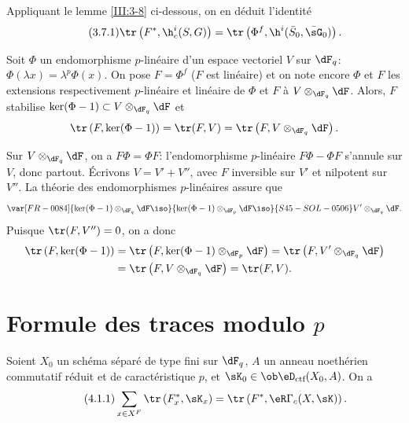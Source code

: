 Appliquant le lemme \ref{III:3-8} ci-dessous, on en déduit l'identité 
\begin{equation*}\tag{3.7.1}\label{III:eq:3-7-1}
  \tr\left(F^*,\h_c^i(S,G)\right) = \tr\left(\Phi^f,\h^i(\bar S_0,\bar\sG_0)\right) \text{.}
\end{equation*}





\begin{lemma_}\label{III:3-8}
Soit $\Phi$ un endomorphisme $p$-linéaire d'un espace vectoriel $V$ sur 
$\dF_q$: $\Phi(\lambda x) = \lambda^p\Phi(x)$. On pose $F=\Phi^f$ ($F$ est 
linéaire) et on note encore $\Phi$ et $F$ les extensions respectivement 
$p$-linéaire et linéaire de $\Phi$ et $F$ à $V\otimes_{\dF_q}\dF$. Alors, $F$ stabilise 
$\ker(\Phi-1)\subset V\otimes_{\dF_q}\dF$ et 
\[
  \tr\left(F,\ker(\Phi-1)\right) = \tr(F,V) = \tr\left(F,V\otimes_{\dF_q}\dF\right) \text{.}
\]
\end{lemma_}

Sur $V\otimes_{\dF_q}\dF$, on a $F\Phi = \Phi F$: l'endomorphisme $p$-linéaire 
$F\Phi-\Phi F$ s'annule sur $V$, donc partout. Écrivons $V=V'+V''$, avec $F$ 
inversible sur $V'$ et nilpotent sur $V''$. La théorie des endomorphismes 
$p$-linéaires assure que 
\[
  \var[FR-0084]{\ker(\Phi-1)\otimes_{\dF_q}\dF \iso}{\ker(\Phi-1)\otimes_{\dF_p}\dF \iso}{S45-SOL-0506} V'\otimes_{\dF_q}\dF \text{.}
\]
Puisque $\tr(F,V'') = 0$, on a donc 
\begin{align*}
  \tr\left(F,\ker(\Phi-1)\right) 
    &= \tr\left(F,\ker(\Phi-1)\otimes_{\dF_p}\dF\right) = \tr\left(F,V'\otimes_{\dF_q}\dF\right) \\
    &= \tr\left(F,V\otimes_{\dF_q}\dF\right) = \tr(F,V) \text{.}
\end{align*}










\section{Formule des traces modulo \texorpdfstring{$p$}{p}}\label{III:4}





\begin{theorem_}\label{III:4-1}
Soient $X_0$ un schéma séparé de type fini sur $\dF_q$, $A$ un anneau 
noethérien commutatif réduit et de caractéristique $p$, et 
$\sK_0\in\ob\eD_\textnormal{ctf}(X_0,A)$. On a 
\begin{equation*}\tag{4.1.1}\label{III:eq:4-1-1}
  \sum_{x\in X^F} \tr\left(F_x^*,\sK_x\right) = \tr\left(F^*,\eR\Gamma_c(X,\sK)\right) \text{.}
\end{equation*}
\end{theorem_}





